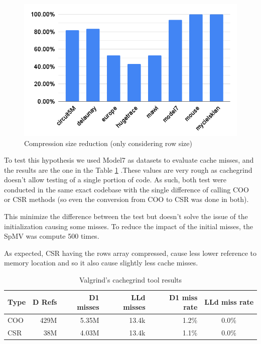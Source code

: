 \documentclass[conference]{IEEEtran}
\begin{document}
\begin{figure}[h!]
	\centering
	\includegraphics[width=0.7\linewidth]{data_images/csr-compression-rate}
	\caption{Compression size reduction (only considering row size)}
	\label{fig:csr-compression-rate}
\end{figure}
\FloatBarrier


To test this hypothesis we used Model7 as datasets to evaluate cache misses, and the results are the one in the Table \ref{tab:cache-results} .These values are very rough as cachegrind doesn't allow testing of a single portion of code. As such, both test were conducted in the same exact codebase with the single difference of calling COO or CSR methods (so even the conversion from COO to CSR was done in both).

This minimize the difference between the test but doesn't solve the issue of the initialization causing some misses. To reduce the impact of the initial misses, the SpMV was compute 500 times.

As expected, CSR having the rows array compressed, cause less lower reference to memory location and so it also cause slightly less cache misses.
\begin{table}[h!]
	\centering
	\begin{adjustbox}{width=\columnwidth}
		\begin{tabular}{lrrrrc}
			\toprule
			\textbf{Type} & \textbf{D Refs} & \textbf{D1 misses} & \textbf{LLd misses} & \textbf{D1 miss rate} & \textbf{LLd miss rate} \\
			\midrule
			COO & 429M & 5.35M & 13.4k & 1.2\% & 0.0\% \\
			CSR & 38M & 4.03M & 13.4k & 1.1\% & 0.0\% \\
			\bottomrule
		\end{tabular}
	\end{adjustbox}
	\vspace{1em}

	\caption{Valgrind's cachegrind tool results}
	\label{tab:cache-results}
\end{table}
\end{document}
